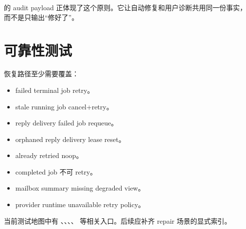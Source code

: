  的 audit payload 正体现了这个原则。它让自动修复和用户诊断共用同一份事实，而不是只输出“修好了”。

\section{可靠性测试}

恢复路径至少需要覆盖：

\begin{itemize}
  \item failed terminal job retry。
  \item stale running job cancel+retry。
  \item reply delivery failed job requeue。
  \item orphaned reply delivery lease reset。
  \item already retried noop。
  \item completed job 不可 retry。
  \item mailbox summary missing degraded view。
  \item provider runtime unavailable retry policy。
\end{itemize}

当前测试地图中有 、、、、 等相关入口。后续应补齐 repair 场景的显式索引。
